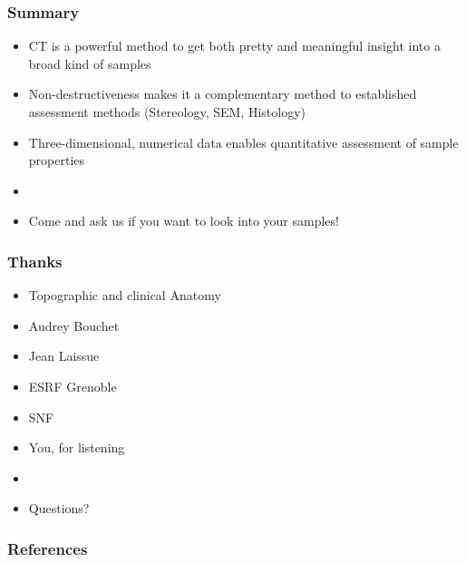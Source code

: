 \documentclass{beamer}
\newcommand{\uct}{\si{\micro}CT\xspace}
\begin{document}
\begin{frame}
	\frametitle{Summary}
	\begin{itemize}
		\item \uct is a powerful method to get both pretty and meaningful insight into a broad kind of samples
		\item Non-destructiveness makes it a complementary method to established assessment methods (Stereology, SEM, Histology)
		\item Three-dimensional, numerical data enables quantitative assessment of sample properties
		\item[]
		\pause
		\item Come and ask us if you want to look into your samples!
	\end{itemize}
\end{frame}

\begin{frame}
	\frametitle{Thanks}
	\begin{itemize}
		\item Topographic and clinical Anatomy
		\item Audrey Bouchet
		\item Jean Laissue
		\item ESRF Grenoble
		\item SNF
		\pause
		\item You, for listening
		\item[]
		\pause
		\item Questions?
	\end{itemize}
\end{frame}

\begin{frame}[allowframebreaks]
	\frametitle{References}
	\renewcommand*{\bibfont}{\scriptsize}
	\printbibliography
\end{frame}
\end{document}
